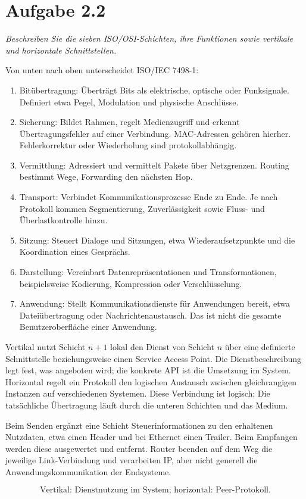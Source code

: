 \documentclass[a4paper,11pt]{article}
\newif\ifexplain
\newcommand{\aufgabe}[1]{\section*{Aufgabe #1}}
\newcommand{\angabe}[1]{{\raggedright\textit{#1}\par}\smallskip}
\newcommand{\explain}[1]{\ifexplain\begin{erklbox}#1\end{erklbox}\fi}
\begin{document}
\aufgabe{2.2}
\angabe{Beschreiben Sie die sieben ISO/OSI-Schichten, ihre Funktionen sowie vertikale und horizontale Schnittstellen.}
Von unten nach oben unterscheidet ISO/IEC 7498-1:
\begin{enumerate}[label=\arabic*.]
\item Bitübertragung: Überträgt Bits als elektrische, optische oder Funksignale. Definiert etwa Pegel, Modulation und physische Anschlüsse.
\item Sicherung: Bildet Rahmen, regelt Medienzugriff und erkennt Übertragungsfehler auf einer Verbindung. MAC-Adressen gehören hierher. Fehlerkorrektur oder Wiederholung sind protokollabhängig.
\item Vermittlung: Adressiert und vermittelt Pakete über Netzgrenzen. Routing bestimmt Wege, Forwarding den nächsten Hop.
\item Transport: Verbindet Kommunikationsprozesse Ende zu Ende. Je nach Protokoll kommen Segmentierung, Zuverlässigkeit sowie Fluss- und Überlastkontrolle hinzu.
\item Sitzung: Steuert Dialoge und Sitzungen, etwa Wiederaufsetzpunkte und die Koordination eines Gesprächs.
\item Darstellung: Vereinbart Datenrepräsentationen und Transformationen, beispielsweise Kodierung, Kompression oder Verschlüsselung.
\item Anwendung: Stellt Kommunikationsdienste für Anwendungen bereit, etwa Dateiübertragung oder Nachrichtenaustausch. Das ist nicht die gesamte Benutzeroberfläche einer Anwendung.
\end{enumerate}
Vertikal nutzt Schicht $n+1$ lokal den Dienst von Schicht $n$ über eine definierte Schnittstelle beziehungsweise einen Service Access Point. Die Dienstbeschreibung legt fest, was angeboten wird; die konkrete API ist die Umsetzung im System. Horizontal regelt ein Protokoll den logischen Austausch zwischen gleichrangigen Instanzen auf verschiedenen Systemen. Diese Verbindung ist logisch: Die tatsächliche Übertragung läuft durch die unteren Schichten und das Medium.

Beim Senden ergänzt eine Schicht Steuerinformationen zu den erhaltenen Nutzdaten, etwa einen Header und bei Ethernet einen Trailer. Beim Empfangen werden diese ausgewertet und entfernt. Router beenden auf dem Weg die jeweilige Link-Verbindung und verarbeiten IP, aber nicht generell die Anwendungskommunikation der Endsysteme.
\explain{Dienst und Protokoll beantworten verschiedene Fragen: Was bekommt die Schicht darüber? Und welche Regeln verwenden die Partner, um diesen Dienst anzubieten? Die horizontale Linie im Modell ist deshalb kein eigenes Kabel. Die Daten müssen trotzdem nach unten und auf der Gegenseite wieder nach oben.}
\[\boxed{\text{Vertikal: Dienstnutzung im System; horizontal: Peer-Protokoll.}}\]
\end{document}
